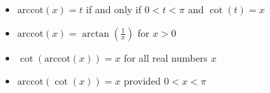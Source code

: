 {\begin{thm}
\begin{itemize}
\begin{itemize}
\item  $\mbox{arccot}(x) = t$ if and only if $0 <  t < \pi$ and $\cot(t) = x$

\item  $\mbox{arccot}(x) =\arctan\left(\frac{1}{x}\right)$ for $x > 0$

\item  $\cot\left(\mbox{arccot}(x)\right) = x$ for all real numbers $x$

\item  $\mbox{arccot}(\cot(x)) = x$ provided $0 < x < \pi$

\end{itemize}

\end{itemize}

\end{thm}

\ebm}

\medskip

